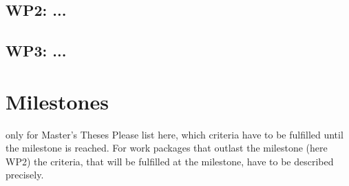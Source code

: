 \documentclass[german=false,thesistype=bachelor,proposal]{tubsthesis}
\begin{document}
\begin{thesis}
\subsection{WP2: ...}
\lipsum[2]

\subsection{WP3: ...}
\lipsum[3]

\section{Milestones}

only for Master's Theses
Please list here, which criteria have to be fulfilled until the milestone is reached.
For work packages that outlast the milestone (here WP2) the criteria,
that will be fulfilled at the milestone, have to be described precisely.

\lipsum[5]

\end{thesis}
\end{document}
